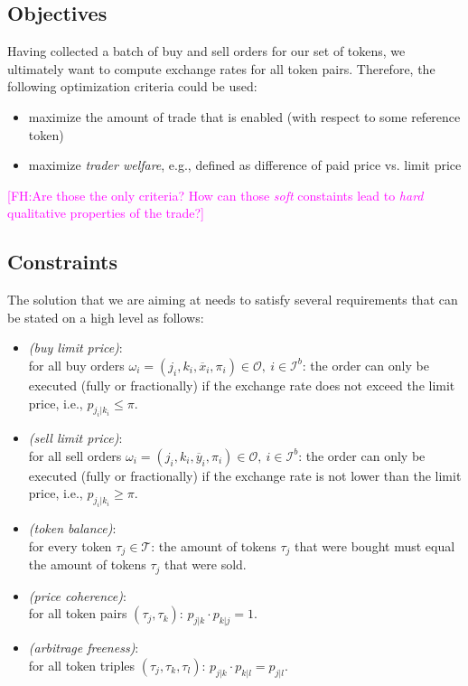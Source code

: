 \documentclass[11pt,parskip=full]{scrartcl}%
\newcommand*{\ie}{i.e., }
\newcommand*{\eg}{e.g., }
\newcommand*{\wrt}{with respect to }
\newcommand*{\tokens}{\mathcal{T}}          %
\newcommand*{\orders}{\mathcal{O}}          %
\newcommand*{\ibuyorders}{\mathcal{I}^b}    %
\newcommand{\FH}[1]{\textcolor{magenta}{[FH:#1]}}
\begin{document}
\subsection{Objectives}
\label{subsec:objectives}

Having collected a batch of buy and sell orders for our set of tokens, we ultimately want to
compute exchange rates for all token pairs.
Therefore, the following optimization criteria could be used:
\begin{itemize}
  \item maximize the amount of trade that is enabled (\wrt some reference token)
  \item maximize \emph{trader welfare}, \eg defined as difference of paid price vs. limit price
\end{itemize}
\FH{Are those the only criteria? How can those \emph{soft} constaints lead to \emph{hard} qualitative properties of the trade?}


\subsection{Constraints}
\label{subsec:constraints}

The solution that we are aiming at needs to satisfy several requirements that can be stated on a
high level as follows:
\begin{itemize}
  \item \emph{(buy limit price)}:\\
  for all buy orders
  $ \omega_i = (j_i,k_i,\overline{x}_i,\pi_i)  \in \orders, \> i \in \ibuyorders $:
  the order can only be executed (fully or fractionally) if the exchange rate does not exceed the
  limit price, \ie $ p_{j_i|k_i} \le \pi $.
  \item \emph{(sell limit price)}:\\
  for all sell orders
  $ \omega_i = (j_i,k_i,\overline{y}_i,\pi_i)  \in \orders, \> i \in \ibuyorders $:
  the order can only be executed (fully or fractionally) if the exchange rate is not lower than the
  limit price, \ie $ p_{j_i|k_i} \ge \pi $.
  \item \emph{(token balance)}:\\
  for every token $ \tau_j \in \tokens $: the amount of tokens $ \tau_j $ that were bought must
  equal the amount of tokens $ \tau_j $ that were sold.
  \item \emph{(price coherence)}:\\
  for all token pairs $ (\tau_j,\tau_k) $: $ p_{j|k} \cdot p_{k|j} = 1 $.
  \item \emph{(arbitrage freeness)}:\\
  for all token triples $ (\tau_j,\tau_k,\tau_l) $: $ p_{j|k} \cdot p_{k|l} = p_{j|l} $.
\end{itemize}
\end{document}

